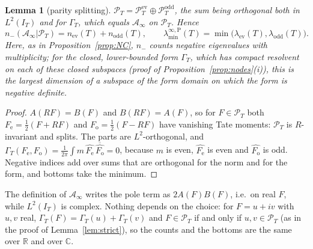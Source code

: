 \documentclass[11pt]{amsart}
\newtheorem{lemma}[theorem]{Lemma}
\theoremstyle{definition}
\theoremstyle{remark}
\newcommand{\C}{\mathbb C}
\newcommand{\R}{\mathbb R}
\newcommand{\PT}{\mathcal P_T}
\newcommand{\IT}{I_T}
\newcommand{\Ainf}{\mathcal A_\infty}
\newcommand{\laminfP}{\lambda^{\infty,\mathrm P}_{\min}}
\begin{document}
\begin{lemma}[parity splitting]\label{lem:parity}
$\PT=\PT^{\mathrm{ev}}\oplus\PT^{\mathrm{odd}}$, the sum being orthogonal both in
$L^2(\IT)$ and for $\Gamma_T$, which equals $\Ainf$ on $\PT$. Hence
\[
n_-(\Ainf|\PT)=n_{\mathrm{ev}}(T)+n_{\mathrm{odd}}(T),\qquad
\laminfP(T)=\min\big(\lambda_{\mathrm{ev}}(T),\lambda_{\mathrm{odd}}(T)\big).
\]
Here, as in Proposition~\ref{prop:NC}, $n_-$ counts negative eigenvalues with multiplicity; for the closed,
lower-bounded form $\Gamma_T$, which has compact resolvent on each of these closed subspaces (proof of
Proposition~\ref{prop:nodes}(i)), this is the largest dimension of a subspace of the form domain on
which the form is negative definite.
\end{lemma}
\begin{proof}
$A(RF)=B(F)$ and $B(RF)=A(F)$, so for $F\in\PT$ both $F_{\mathrm e}=\frac12(F+RF)$ and
$F_{\mathrm o}=\frac12(F-RF)$ have vanishing Tate moments: $\PT$ is $R$-invariant and splits. The
parts are $L^2$-orthogonal, and
$\Gamma_T(F_{\mathrm e},F_{\mathrm o})=\frac1{2\pi}\int m\,\widehat{F_{\mathrm e}}\,\overline{\widehat{F_{\mathrm o}}}=0$,
because $m$ is even, $\widehat{F_{\mathrm e}}$ is even and $\widehat{F_{\mathrm o}}$ is odd. Negative
indices add over sums that are orthogonal for the norm and for the form, and bottoms take the minimum.
\end{proof}
The definition of $\Ainf$ writes the pole term as $2A(F)B(F)$, i.e.\ on real $F$, while $L^2(\IT)$ is
complex. Nothing depends on the choice: for $F=u+iv$ with $u,v$ real, $\Gamma_T(F)=\Gamma_T(u)+\Gamma_T(v)$
and $F\in\PT$ if and only if $u,v\in\PT$ (as in the proof of Lemma~\ref{lem:strict}), so the counts and
the bottoms are the same over $\R$ and over $\C$.
\end{document}
